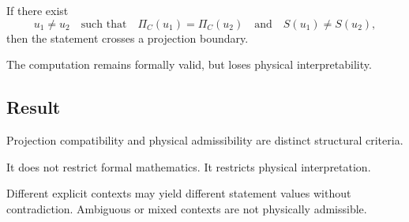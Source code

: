 If there exist
\[
u_1 \neq u_2
\quad\text{such that}\quad
\Pi_C(u_1) = \Pi_C(u_2)
\quad\text{and}\quad
S(u_1) \neq S(u_2),
\]
then the statement crosses a projection boundary.

The computation remains formally valid,
but loses physical interpretability.

\subsection{Result}

Projection compatibility and physical admissibility are distinct
structural criteria.

It does not restrict formal mathematics.
It restricts physical interpretation.

Different explicit contexts may yield different statement values without
contradiction. Ambiguous or mixed contexts are not physically admissible.
